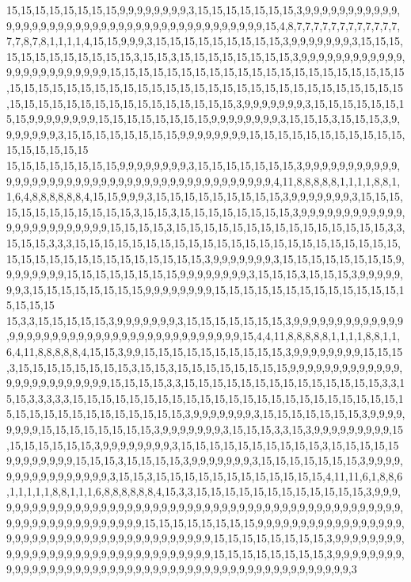 15,15,15,15,15,15,15,15,9,9,9,9,9,9,9,9,3,15,15,15,15,15,15,15,3,9,9,9,9,9,9,9,9,9,9,9,9,9,9,9,9,9,9,9,9,9,9,9,9,9,9,9,9,9,9,9,9,9,9,9,9,9,9,9,9,9,15,4,8,7,7,7,7,7,7,7,7,7,7,7,7,7,7,8,7,8,1,1,1,1,4,15,15,9,9,9,3,15,15,15,15,15,15,15,15,15,3,9,9,9,9,9,9,9,3,15,15,15,15,15,15,15,15,15,15,15,15,3,15,15,3,15,15,15,15,15,15,15,15,3,9,9,9,9,9,9,9,9,9,9,9,9,9,9,9,9,9,9,9,9,9,9,9,9,15,15,15,15,15,15,15,15,15,15,15,15,15,15,15,15,15,15,15,15,15,15,15,15,15,15,15,15,15,15,15,15,15,15,15,15,15,15,15,15,15,15,15,15,15,15,15,15,15,15,15,15,15,15,15,15,15,15,15,15,15,15,15,15,15,3,9,9,9,9,9,9,9,3,15,15,15,15,15,15,15,15,9,9,9,9,9,9,9,9,15,15,15,15,15,15,15,15,9,9,9,9,9,9,9,9,3,15,15,15,3,15,15,15,3,9,9,9,9,9,9,9,3,15,15,15,15,15,15,15,15,9,9,9,9,9,9,9,9,15,15,15,15,15,15,15,15,15,15,15,15,15,15,15,15,15
15,15,15,15,15,15,15,15,9,9,9,9,9,9,9,9,3,15,15,15,15,15,15,15,3,9,9,9,9,9,9,9,9,9,9,9,9,9,9,9,9,9,9,9,9,9,9,9,9,9,9,9,9,9,9,9,9,9,9,9,9,9,9,9,9,9,9,4,11,8,8,8,8,8,1,1,1,1,8,8,1,1,6,4,8,8,8,8,8,8,4,15,15,9,9,9,3,15,15,15,15,15,15,15,15,15,3,9,9,9,9,9,9,9,3,15,15,15,15,15,15,15,15,15,15,15,15,3,15,15,3,15,15,15,15,15,15,15,15,3,9,9,9,9,9,9,9,9,9,9,9,9,9,9,9,9,9,9,9,9,9,9,9,9,15,15,15,15,3,15,15,15,15,15,15,15,15,15,15,15,15,15,15,15,3,3,15,15,15,3,3,3,15,15,15,15,15,15,15,15,15,15,15,15,15,15,15,15,15,15,15,15,15,15,15,15,15,15,15,15,15,15,15,15,15,15,15,15,15,3,9,9,9,9,9,9,9,3,15,15,15,15,15,15,15,15,9,9,9,9,9,9,9,9,15,15,15,15,15,15,15,15,9,9,9,9,9,9,9,9,3,15,15,15,3,15,15,15,3,9,9,9,9,9,9,9,3,15,15,15,15,15,15,15,15,9,9,9,9,9,9,9,9,15,15,15,15,15,15,15,15,15,15,15,15,15,15,15,15,15
15,3,3,15,15,15,15,15,3,9,9,9,9,9,9,9,3,15,15,15,15,15,15,15,3,9,9,9,9,9,9,9,9,9,9,9,9,9,9,9,9,9,9,9,9,9,9,9,9,9,9,9,9,9,9,9,9,9,9,9,9,9,9,9,9,15,4,4,11,8,8,8,8,8,1,1,1,1,8,8,1,1,6,4,11,8,8,8,8,8,4,15,15,3,9,9,15,15,15,15,15,15,15,15,15,15,3,9,9,9,9,9,9,9,9,15,15,15,3,15,15,15,15,15,15,15,15,3,15,15,3,15,15,15,15,15,15,15,15,9,9,9,9,9,9,9,9,9,9,9,9,9,9,9,9,9,9,9,9,9,9,9,9,9,15,15,15,15,3,3,15,15,15,15,15,15,15,15,15,15,15,15,15,15,3,3,15,15,3,3,3,3,3,15,15,15,15,15,15,15,15,15,15,15,15,15,15,15,15,15,15,15,15,15,15,15,15,15,15,15,15,15,15,15,15,15,15,15,15,3,9,9,9,9,9,9,9,3,15,15,15,15,15,15,15,3,9,9,9,9,9,9,9,9,15,15,15,15,15,15,15,15,3,9,9,9,9,9,9,9,3,15,15,15,3,3,15,3,9,9,9,9,9,9,9,9,9,15,15,15,15,15,15,15,3,9,9,9,9,9,9,9,9,3,15,15,15,15,15,15,15,15,15,15,3,15,15,15,15,15
9,9,9,9,9,9,9,9,15,15,15,3,15,15,15,15,3,9,9,9,9,9,9,9,3,15,15,15,15,15,15,15,3,9,9,9,9,9,9,9,9,9,9,9,9,9,9,9,9,3,15,15,3,15,15,15,15,15,15,15,15,15,15,15,15,4,11,11,6,1,8,8,6,1,1,1,1,1,8,8,1,1,1,6,8,8,8,8,8,8,4,15,3,3,15,15,15,15,15,15,15,15,15,15,15,15,3,9,9,9,9,9,9,9,9,9,9,9,9,9,9,9,9,9,9,9,9,9,9,9,9,9,9,9,9,9,9,9,9,9,9,9,9,9,9,9,9,9,9,9,9,9,9,9,9,9,9,9,9,9,9,9,9,9,9,9,9,9,9,9,9,9,15,15,15,15,15,15,15,15,9,9,9,9,9,9,9,9,9,9,9,9,9,9,9,9,9,9,9,9,9,9,9,9,9,9,9,9,9,9,9,9,9,9,9,9,9,9,9,9,9,15,15,15,15,15,15,15,15,3,9,9,9,9,9,9,9,9,9,9,9,9,9,9,9,9,9,9,9,9,9,9,9,9,9,9,9,9,9,9,9,9,15,15,15,15,15,15,15,15,3,9,9,9,9,9,9,9,9,9,9,9,9,9,9,9,9,9,9,9,9,9,9,9,9,9,9,9,9,9,9,9,9,9,9,9,9,9,9,9,9,9,9,9,9,9,9,9,9,3
